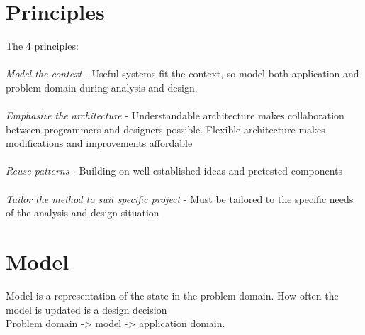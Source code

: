 \section{Principles}
The 4 principles:
\\\\
\textit{Model the context} -
Useful systems fit the context, so model both application and problem domain during analysis and design.
\\\\
\textit{Emphasize the architecture} -
Understandable architecture makes collaboration between programmers and designers possible. Flexible architecture makes modifications and improvements affordable
\\\\
\textit{Reuse patterns} -
Building on well-established ideas and pretested components
\\\\
\textit{Tailor the method to suit specific project} -
Must be tailored to the specific needs of the analysis and design situation 

\section*{Model}
Model is a representation of the state in the problem domain. How often the model is updated is a design decision\\
Problem domain -> model -> application domain.
